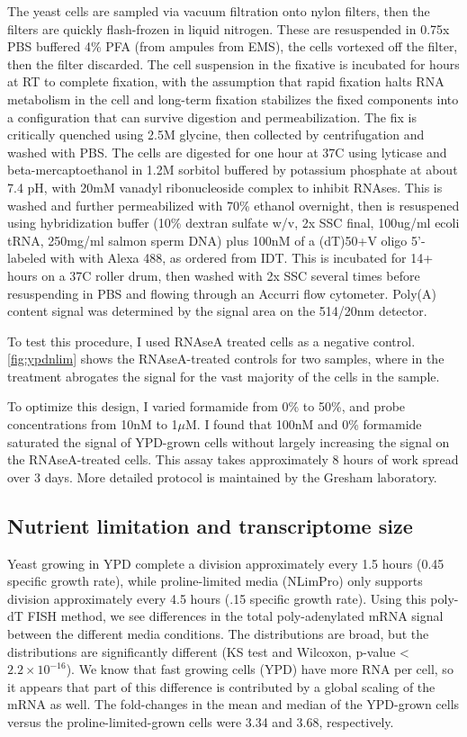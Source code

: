 The yeast cells are sampled via vacuum filtration onto nylon
filters, then the filters are quickly flash-frozen in liquid nitrogen.
These are resuspended in 0.75x PBS buffered 4\% PFA (from ampules from
EMS), the cells vortexed off the filter, then the filter discarded.
The cell suspension in the fixative is incubated for hours at RT to
complete fixation, with the assumption that rapid fixation halts
RNA metabolism in the cell and long-term fixation stabilizes the fixed
components into a configuration that can survive digestion and 
permeabilization. The fix is critically quenched using 2.5M glycine,
then collected by centrifugation and washed with PBS. The cells are
digested for one hour at 37C using lyticase and beta-mercaptoethanol
in 1.2M sorbitol buffered
by potassium phosphate at about 7.4 pH, with 20mM vanadyl
ribonucleoside complex to inhibit RNAses. 
This is washed and further permeabilized with 70\% ethanol overnight,
then is resuspened using hybridization buffer
(10\% dextran sulfate w/v, 2x SSC final, 100ug/ml ecoli tRNA, 
250mg/ml salmon sperm DNA) plus 100nM of a (dT)50+V oligo 5'-labeled
with with Alexa 488, as ordered from IDT. 
This is incubated for 14+ hours on a 37C roller drum, then washed with
2x SSC several times before resuspending in PBS and flowing through an
Accurri flow cytometer.
Poly(A) content signal was determined by the signal area on the
514/20nm detector.

To test this procedure, I used RNAseA treated cells as a negative
control.
\autoref{fig:ypdnlim} shows the RNAseA-treated controls for two
samples, where in the treatment abrogates the signal for the vast
majority of the cells in the sample.

To optimize this design, I varied formamide from 0\% to 50\%, and
probe concentrations from 10nM to 1$\mu$M. I found that 100nM and 0\%
formamide saturated the signal of YPD-grown cells without largely
increasing the signal on the RNAseA-treated cells.
This assay takes approximately 8 hours of work spread over 3 days.
More detailed protocol is maintained by the Gresham laboratory.


%
%
%
\subsection{Nutrient limitation and transcriptome size}
%
%
%

Yeast growing in
YPD complete a division approximately every 1.5 hours (0.45 specific
growth rate), while 
proline-limited media (NLimPro) only supports division approximately
every 4.5 hours (.15 specific growth rate). 
Using this poly-dT FISH method, we see differences in the total 
poly-adenylated mRNA signal between the different media conditions. 
The distributions are broad, but the distributions are significantly
different (KS test and Wilcoxon, p-value < $2.2 \times 10^{-16}$).
We know that fast growing cells (YPD) have more RNA per cell, so it
appears that part of this difference is contributed by a global
scaling of the mRNA as well.
The fold-changes in the mean and median of the YPD-grown cells versus
the proline-limited-grown cells were 3.34 and 3.68, respectively.

